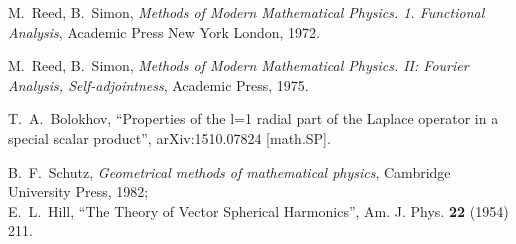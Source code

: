 \documentclass[12pt]{article}
\begin{document}
\begin{thebibliography}{0}
  M.~Reed, B.~Simon, \emph{Methods of Modern Mathematical
Physics. 1. Functional Analysis}, Academic Press New York London, 1972.

 M.~Reed, B.~Simon, \emph{Methods of Modern Mathematical Physics.
II: Fourier Analysis, Self-adjointness}, Academic Press, 1975.

 T.~A.~Bolokhov,
``Properties of the l=1 radial part of the Laplace operator in a special
scalar product'', arXiv:1510.07824 [math.SP].
    
    B.~F.~Schutz, \emph{Geometrical methods of mathematical physics},
    Cambridge University Press, 1982;\\
    E.~L.~Hill, ``The Theory of Vector Spherical Harmonics'',
    Am. J. Phys. {\bf 22} (1954) 211.




    

\end{thebibliography}
\end{document}

